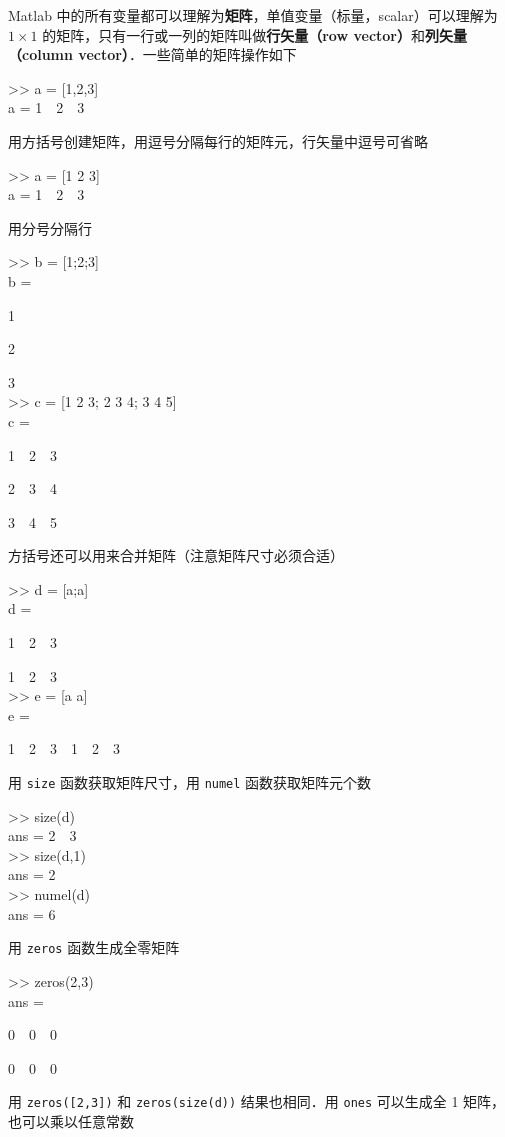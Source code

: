 Matlab 中的所有变量都可以理解为\textbf{矩阵}，单值变量（标量，scalar）可以理解为 $1\times 1$ 的矩阵，只有一行或一列的矩阵叫做\textbf{行矢量（row vector）}和\textbf{列矢量（column vector）}．一些简单的矩阵操作如下
\begin{Command}
>> a = [1,2,3] \\
a = 1\ \ 2\ \ 3
\end{Command}
用方括号创建矩阵，用逗号分隔每行的矩阵元，行矢量中逗号可省略
\begin{Command}
>> a = [1 2 3] \\
a = 1\ \ 2\ \ 3
\end{Command}
用分号分隔行
\begin{Command}
>> b = [1;2;3] \\
b = \par
1 \par
2 \par
3 \\
>> c = [1 2 3; 2 3 4; 3 4 5]\\
c = \par
1\ \ 2\ \ 3 \par
2\ \ 3\ \ 4 \par
3\ \ 4\ \ 5
\end{Command}
方括号还可以用来合并矩阵（注意矩阵尺寸必须合适）
\begin{Command}
>> d = [a;a] \\
d = \par
1\ \ 2\ \ 3 \par
1\ \ 2\ \ 3 \\
>> e = [a a] \\
e = \par
1\ \ 2\ \ 3\ \ 1\ \ 2\ \ 3
\end{Command}
用 \texttt{size} 函数获取矩阵尺寸，用 \texttt{numel} 函数获取矩阵元个数
\begin{Command}
>> size(d) \\
ans = 2\ \ 3 \\
>> size(d,1) \\
ans = 2 \\
>> numel(d) \\
ans = 6
\end{Command}
用 \texttt{zeros} 函数生成全零矩阵
\begin{Command}
>> zeros(2,3) \\
ans = \par
0\ \ 0\ \ 0 \par
0\ \ 0\ \ 0
\end{Command}
用 \texttt{zeros([2,3])} 和 \texttt{zeros(size(d))} 结果也相同．用 \texttt{ones} 可以生成全 1 矩阵，也可以乘以任意常数
